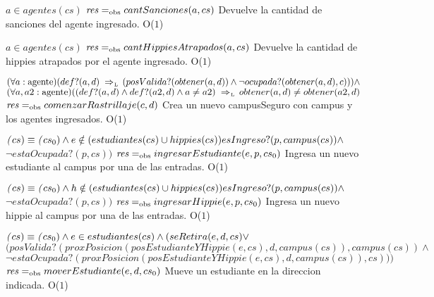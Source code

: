  {$a \in agentes(cs)$}
 {$\text{\textit{res}} =_{\mathrm{obs}} cantSanciones(a, cs)$}
 {Devuelve la cantidad de sanciones del agente ingresado.}
 {O($1$)}
 {}
 
 {$a \in agentes(cs)$}
 {$\text{\textit{res}} =_{\mathrm{obs}} cantHippiesAtrapados(a, cs)$}
 {Devuelve la cantidad de hippies atrapados por el agente ingresado.}
 {O($1$)}
 {}
 

{$(\paratodo{agente}{a})(def?(a, d) \impluego (posValida?(obtener(a, d)) \land \neg ocupada?(obtener(a, d), c))) \land $\\$ (\paratodo{agente}{a, a2}) ((def?(a, d) \land def?(a2, d) \land a \neq a2) \impluego obtener(a, d) \neq obtener(a2, d)$}
{$\text{\textit{res}} =_{\mathrm{obs}} comenzarRastrillaje(c, d)$}
{Crea un nuevo campusSeguro con campus y los agentes ingresados.}
{O($1$)}
{}
 
{$\text{\textit{(}}cs) \equiv \text{\textit{(}}cs_0) \land e \notin (estudiantes(cs) \cup hippies(cs)) esIngreso?(p, campus(cs)) \land $\\$\neg estaOcupada?(p, cs))$}
{$\text{\textit{res}} =_{\mathrm{obs}} ingresarEstudiante(e, p, cs_0)$}
{Ingresa un nuevo estudiante al campus por una de las entradas.}
{O($1$)}
{}

{$\text{\textit{(}}cs) \equiv \text{\textit{(}}cs_0) \land h \notin (estudiantes(cs) \cup hippies(cs)) esIngreso?(p, campus(cs)) \land $\\$\neg estaOcupada?(p, cs))$}
{$\text{\textit{res}} =_{\mathrm{obs}} ingresarHippie(e, p, cs_0)$}
{Ingresa un nuevo hippie al campus por una de las entradas.}
{O($1$)}
{}

{$\text{\textit{(}}cs) \equiv \text{\textit{(}}cs_0) \land e \in estudiantes(cs) \land (seRetira(e, d, cs) \lor $\\$ (posValida?(proxPosicion(posEstudianteYHippie(e, cs), d, campus(cs)), campus(cs)) \land $\\$ \neg estaOcupada?(proxPosicion(posEstudianteYHippie(e, cs), d, campus(cs)), cs)))$}
{$\text{\textit{res}} =_{\mathrm{obs}} moverEstudiante(e, d, cs_0)$}
{Mueve un estudiante en la direccion indicada.}
{O($1$)}
{}

